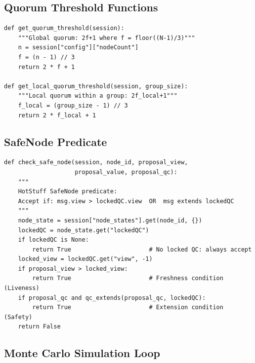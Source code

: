 \documentclass[
12pt,
oneside,
singlespacing,
parskip,
]{article}
\begin{document}
\subsection{Quorum Threshold Functions}

\begin{lstlisting}[caption={Global and local quorum thresholds (\texttt{consensus\_engine.py})}, label=lst:quorum]
def get_quorum_threshold(session):
    """Global quorum: 2f+1 where f = floor((N-1)/3)"""
    n = session["config"]["nodeCount"]
    f = (n - 1) // 3
    return 2 * f + 1

def get_local_quorum_threshold(session, group_size):
    """Local quorum within a group: 2f_local+1"""
    f_local = (group_size - 1) // 3
    return 2 * f_local + 1
\end{lstlisting}

\subsection{SafeNode Predicate}

\begin{lstlisting}[caption={SafeNode predicate (\texttt{consensus\_engine.py})}, label=lst:safenode]
def check_safe_node(session, node_id, proposal_view,
                    proposal_value, proposal_qc):
    """
    HotStuff SafeNode predicate:
    Accept if: msg.view > lockedQC.view  OR  msg extends lockedQC
    """
    node_state = session["node_states"].get(node_id, {})
    lockedQC = node_state.get("lockedQC")
    if lockedQC is None:
        return True                      # No locked QC: always accept
    locked_view = lockedQC.get("view", -1)
    if proposal_view > locked_view:
        return True                      # Freshness condition (Liveness)
    if proposal_qc and qc_extends(proposal_qc, lockedQC):
        return True                      # Extension condition (Safety)
    return False
\end{lstlisting}

\subsection{Monte Carlo Simulation Loop}
\end{document}
